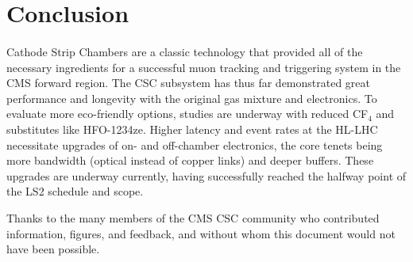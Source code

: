 \documentclass[a4paper,11pt]{article}
\begin{document}
\section{Conclusion}
\label{sec:conclusion}
\paragraph{}
Cathode Strip Chambers are a classic technology that provided all of the necessary ingredients for a successful muon tracking and triggering system in the CMS forward region.
The CSC subsystem has thus far demonstrated great performance and longevity with the original gas mixture and electronics.
To evaluate more eco-friendly options, studies are underway with reduced CF$_4$ and substitutes like HFO-1234ze.
Higher latency and event rates at the HL-LHC necessitate upgrades of on- and off-chamber electronics, the core tenets being more bandwidth (optical instead of copper links) and deeper buffers. These upgrades are underway currently, having successfully reached the halfway point of the LS2 schedule and scope.

\acknowledgments

Thanks to the many members of the CMS CSC community who contributed information, figures, and feedback, and without whom this document would not have been possible. 
\end{document}
